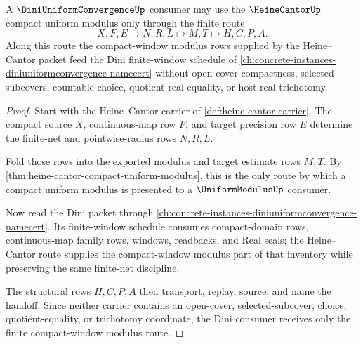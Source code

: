 \begin{theorem}
\label{thm:heine-cantor-dini-window-handoff}
A $\DiniUniformConvergenceUp$ consumer may use the $\HeineCantorUp$ compact uniform modulus only through the finite route
$$
X,F,E \longmapsto N,R,L \longmapsto M,T \longmapsto H,C,P,A.
$$
Along this route the compact-window modulus rows supplied by the Heine--Cantor packet feed the Dini finite-window schedule of \autoref{ch:concrete-instances-diniuniformconvergence-namecert} without open-cover compactness, selected subcovers, countable choice, quotient real equality, or host real trichotomy.
\end{theorem}
\begin{proof}
Start with the Heine--Cantor carrier of \autoref{def:heine-cantor-carrier}. The compact source $X$, continuous-map row $F$, and target precision row $E$ determine the finite-net and pointwise-radius rows $N,R,L$.

Fold those rows into the exported modulus and target estimate rows $M,T$. By \autoref{thm:heine-cantor-compact-uniform-modulus}, this is the only route by which a compact uniform modulus is presented to a $\UniformModulusUp$ consumer.

Now read the Dini packet through \autoref{ch:concrete-instances-diniuniformconvergence-namecert}. Its finite-window schedule consumes compact-domain rows, continuous-map family rows, windows, readbacks, and Real seals; the Heine--Cantor route supplies the compact-window modulus part of that inventory while preserving the same finite-net discipline.

The structural rows $H,C,P,A$ then transport, replay, source, and name the handoff. Since neither carrier contains an open-cover, selected-subcover, choice, quotient-equality, or trichotomy coordinate, the Dini consumer receives only the finite compact-window modulus route.
\end{proof}

